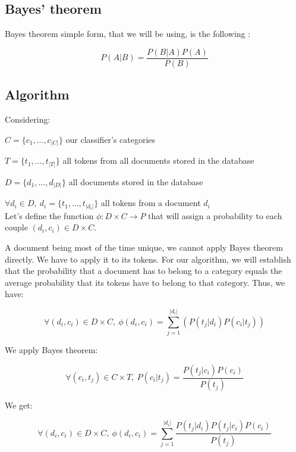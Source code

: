 \documentclass[a4paper,11pt]{article}
\begin{document}
\subsection{Bayes' theorem}

Bayes theorem simple form, that we will be using, is the following :

\begin{equation}
    P(A| B) = \frac{P(B | A) P(A)}{P(B)}
\end{equation}


\subsection{Algorithm}

Considering:

$C = \{c_1, ..., c_{|C|}\}$ our classifier's categories

$T = \{t_1, ..., t_{|T|}\}$ all tokens from all documents stored in the database

$D = \{d_1, ..., d_{|D|}\}$ all documents stored in the database

$\forall d_i \in D,\ d_i = \{t_1, ..., t_{|d_i|}\}$ all tokens from a document $d_i$
~\\

Let's define the function $\phi : D \times C \rightarrow P$ that will assign
a probability to each couple
$(d_i, c_i) \in D \times C$.

A document being most of the time unique, we cannot apply Bayes theorem
directly. We have to apply it to its tokens. For our algorithm, we will
establish that the probability that a document has to belong to a category
equals the average probability that its tokens have to belong to that
category. Thus, we have:

\begin{equation}
    \forall (d_i, c_i) \in D \times C,\ 
    \phi(d_i, c_i)
    = \sum_{j=1}^{|d_i|} (P(t_j | d_i) P(c_i | t_j))
\end{equation}

We apply Bayes theorem:

\begin{equation}
    \forall (c_i, t_j) \in C \times T,\ 
    P(c_i| t_j)
    = \frac{P(t_j | c_i) P(c_i)}{P(t_j)}
\end{equation}

We get:

\begin{equation}\label{eq:final_prob}
    \forall (d_i, c_i) \in D \times C,\ 
    \phi(d_i, c_i)
    = \sum_{j=1}^{|d_i|} \frac{P(t_j | d_i) P(t_j | c_i) P(c_i)}{P(t_j)}
\end{equation}
\end{document}
